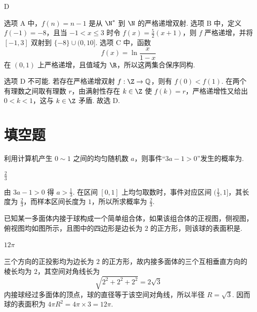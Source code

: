 \begin{answer}
D
\end{answer}

\begin{solution}
选项 A 中，\(f(n)=n-1\) 是从 \(\N^{*}\) 到 \(\N\) 的严格递增双射. 选项 B 中，定义
\(f(-1)=-8\)，且当 \(-1<x\leqslant3\) 时令 \(f(x)=\frac52(x+1)\)，则 \(f\) 严格递增，并将 \([-1,3]\) 双射到 \(\{-8\}\cup(0,10]\). 选项 C 中，函数
\[
f(x)=\ln\frac{x}{1-x}
\]
在 \((0,1)\) 上严格递增，且值域为 \(\R\)，所以这两集合保序同构.

选项 D 不可能. 若存在严格递增双射 \(f:\Z\to\mathbb{Q}\)，则有 \(f(0)<f(1)\). 在两个有理数之间取有理数 \(r\)，由满射性存在 \(k\in\Z\) 使 \(f(k)=r\)，严格递增性又给出 \(0<k<1\)，这与 \(k\in\Z\) 矛盾. 故选 D.
\end{solution}

\section{填空题}

\begin{problem}
利用计算机产生 \(0 \sim 1\) 之间的均匀随机数 \(a\)，则事件“\(3a - 1 > 0\)”发生的概率为\fillinblank{}.
\end{problem}

\begin{answer}
\(\frac{2}{3}\)
\end{answer}

\begin{solution}
由 \(3a-1>0\) 得 \(a>\frac13\). 在区间 \([0,1]\) 上均匀取数时，事件对应区间 \((\frac13,1]\)，其长度为 \(\frac23\)，而样本区间长度为 \(1\)，所以所求概率为 \(\frac23\).
\end{solution}

\begin{problem}
已知某一多面体内接于球构成一个简单组合体，如果该组合体的正视图，侧视图，俯视图均如图所示，且图中的四边形是边长为 \(2\) 的正方形，则该球的表面积是\fillinblank{}.

\end{problem}

\begin{answer}
\(12\pi\)
\end{answer}

\begin{solution}
三个方向的正投影均为边长为 \(2\) 的正方形，故内接多面体的三个互相垂直方向的棱长均为 \(2\)，其空间对角线长为
\[
\sqrt{2^2+2^2+2^2}=2\sqrt3
\]
内接球经过多面体的顶点，球的直径等于该空间对角线，所以半径 \(R=\sqrt3\). 因而球的表面积为 \(4\pi R^2=4\pi\times3=12\pi\).
\end{solution}

